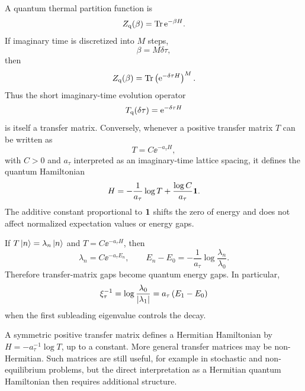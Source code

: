 A quantum thermal partition function is
\begin{equation}
\label{eq:quantum-thermal-partition-function}
    Z_{\rm q}(\beta)
    =
    \operatorname{Tr} \mathrm{e}^{-\beta H} .
\end{equation}
If imaginary time is discretized into $M$ steps,
\begin{equation}
    \beta=M\delta\tau,
\end{equation}
then
\begin{equation}
\label{eq:quantum-partition-transfer-matrix}
    Z_{\rm q}(\beta)
    =
    \operatorname{Tr}\left(\mathrm{e}^{-\delta\tau H}\right)^M .
\end{equation}
Thus the short imaginary-time evolution operator
\begin{equation}
\label{eq:quantum-transfer-matrix-definition}
    T_{\rm q}(\delta\tau)=\mathrm{e}^{-\delta\tau H}
\end{equation}
is itself a transfer matrix. Conversely, whenever a positive transfer matrix $T$
can be written as
\begin{equation}
\label{eq:hamiltonian-from-transfer-matrix}
    T=C\ee^{-a_\tau H},
\end{equation}
with $C>0$ and $a_\tau$ interpreted as an imaginary-time lattice spacing, it
defines the quantum Hamiltonian
\begin{equation}
\label{eq:hamiltonian-log-transfer-matrix}
    H
    =
    -\frac{1}{a_\tau}\log T
    +
    \frac{\log C}{a_\tau}\mathbf{1} .
\end{equation}
The additive constant proportional to $\mathbf{1}$ shifts the zero of energy and does not
affect normalized expectation values or energy gaps.

If $T\left|n\right\rangle=\lambda_n\left|n\right\rangle$ and
$T=C\ee^{-a_\tau H}$, then
\begin{equation}
\label{eq:transfer-eigenvalues-energy-levels}
    \lambda_n=C\ee^{-a_\tau E_n},
    \qquad
    E_n-E_0
    =
    -\frac{1}{a_\tau}
    \log\frac{\lambda_n}{\lambda_0} .
\end{equation}
Therefore transfer-matrix gaps become quantum energy gaps. In particular,
\begin{equation}
\label{eq:correlation-length-quantum-gap}
    \xi_\tau^{-1}
    =
    \log\frac{\lambda_0}{\left|\lambda_1\right|}
    =
    a_\tau\,(E_1-E_0)
\end{equation}
when the first subleading eigenvalue controls the decay.

\begin{remark}
A symmetric positive transfer matrix defines a Hermitian Hamiltonian by
$H=-a_\tau^{-1}\log T$, up to a constant. More general transfer matrices may be
non-Hermitian. Such matrices are still useful, for example in stochastic and
non-equilibrium problems, but the direct interpretation as a Hermitian quantum
Hamiltonian then requires additional structure.
\end{remark}

